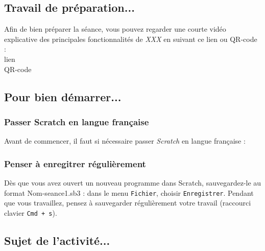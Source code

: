 \subsection{Travail de préparation...}

Afin de bien préparer la séance, vous pouvez regarder une courte vidéo explicative des principales fonctionnalités de \emph{XXX} en suivant ce lien ou QR-code :\\

lien\\
QR-code

\subsection{Pour bien démarrer...}

\subsubsection{Passer Scratch en langue française} 

Avant de commencer, il faut si nécessaire passer \emph{Scratch} en langue française :


\subsubsection{Penser à enregitrer régulièrement}

Dès que vous avez ouvert un nouveau programme dans Scratch, sauvegardez-le au format Nom-seance1.sb3 : dans le menu \texttt{Fichier}, choisir \texttt{Enregistrer}. Pendant que vous travaillez, pensez à sauvegarder régulièrement votre travail (raccourci clavier \texttt{Cmd + s}).   

\vfill

\subsection{Sujet de l'activité...}

\vspace{10pt}



